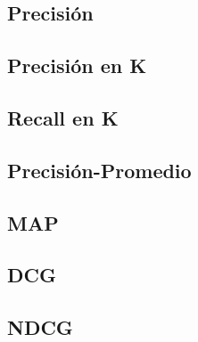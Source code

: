 \subsection{Precisión}

\subsection{Precisión en K}

\subsection{Recall en K}

\subsection{Precisión-Promedio}

\subsection{MAP}

\subsection{DCG}

\subsection{NDCG}
